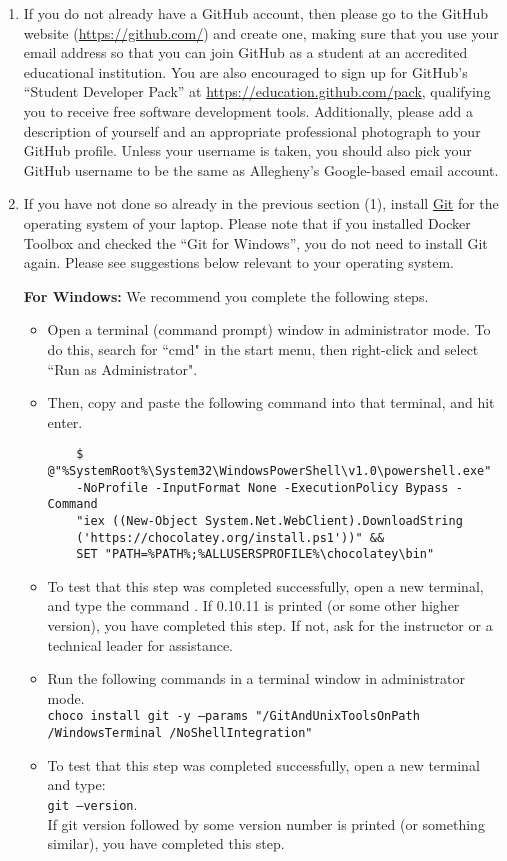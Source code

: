 \begin{enumerate}

  \item If you do not already have a GitHub account, then please go to the GitHub website (\url{https://github.com/}) and create one, making sure
    that you use your  email address so that you can join GitHub as a student at an accredited
    educational institution. You are also encouraged to sign up for GitHub's ``Student Developer Pack'' at
    \url{https://education.github.com/pack}, qualifying you to receive free software development tools. Additionally,
    please add a description of yourself and an appropriate professional photograph to your GitHub profile. Unless your
    username is taken, you should also pick your GitHub username to be the same as Allegheny's Google-based email
    account. 
  
  \item If you have not done so already in the previous section (1), install \href{https://git-scm.com/downloads}{Git} for the operating system of your laptop. Please note that if you installed Docker Toolbox and checked the ``Git for Windows'', you do not need to install Git again. Please see suggestions below relevant to your operating system.
  
  \textbf{For Windows:} 
   We recommend you complete the following steps.
  \begin{itemize}
  	\item Open a terminal (command prompt) window in administrator mode. To do this, search for ``cmd" in the start menu, then right-click and select ``Run as Administrator". 
  	\item Then, copy and paste the following command into that terminal, and hit enter.   
  	\begin{verbatim}
  	$ @"%SystemRoot%\System32\WindowsPowerShell\v1.0\powershell.exe" 
  	-NoProfile -InputFormat None -ExecutionPolicy Bypass -Command 
  	"iex ((New-Object System.Net.WebClient).DownloadString
  	('https://chocolatey.org/install.ps1'))" && 
  	SET "PATH=%PATH%;%ALLUSERSPROFILE%\chocolatey\bin"
  	\end{verbatim}
	\item To test that this step was completed successfully, open a new terminal, and type the command . If 0.10.11 is printed (or some other higher version), you have completed this step. If not, ask for the instructor or a technical leader for assistance.
	\item Run the following commands in a terminal window in administrator mode. \\
	{\tt choco install git -y --params "/GitAndUnixToolsOnPath} \\
	{\tt /WindowsTerminal /NoShellIntegration"}
	\item To test that this step was completed successfully, open a new terminal and type: \\ {\tt git --version}. \\
	If git version followed by some version number is printed (or something similar), you have completed this step.
	\end{itemize}
	

\end{enumerate}

